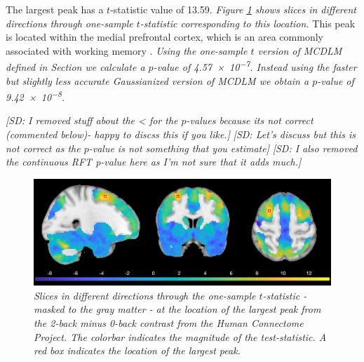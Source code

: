 \documentclass{article}
\newcommand{\sdcom}[1]{\textit{\color{red} [SD: #1]}}
\newcommand{\nt}[1]{\textit{\color{red} #1}}
\begin{document}
The largest peak has a $t$-statistic value of 13.59. \nt{Figure \ref{fig.hcp} shows slices in different directions through one-sample $t$-statistic corresponding to this location.} This peak is located within the medial prefrontal cortex, which is an area commonly associated with working memory \citep{euston2012role,perlstein2002dissociation}. \nt{Using the one-sample $t$ version of MCDLM defined in Section we calculate a $p$-value of \num{4.57e-7}. Instead using the faster but slightly less accurate Gaussianized version of MCDLM we obtain a $p$-value of \num{9.42e-8}. }

\sdcom{I removed stuff about the < for the $p$-values because its not correct (commented below)- happy to discss this if you like.}\sdcom{Let's discuss but this is not correct as the $p$-value is not something that you estimate}\sdcom{I also removed the continuous RFT p-value here as I'm not sure that it adds much.}


\begin{figure}[!htp]
	\centering
	\includegraphics[width = \textwidth]{figure/tstatpeak.png}
	\caption{\nt{Slices in different directions through the one-sample $t$-statistic - masked to the gray matter - at the location of the largest peak from the 2-back minus 0-back contrast from the Human Connectome Project. The colorbar indicates the magnitude of the test-statistic. A red box indicates the location of the largest peak.}\label{fig.hcp}}
\end{figure}
\end{document}
